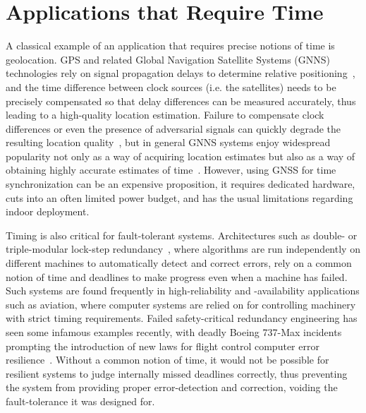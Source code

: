 
\section{Applications that Require Time}
\label{sec:motivation}

A classical example of an application that requires precise notions of time is geolocation. GPS and related Global Navigation Satellite Systems (GNNS) technologies rely on signal propagation delays to determine relative positioning~\cite{intro-to-gnss}, and the time difference between clock sources (i.e. the satellites) needs to be precisely compensated so that delay differences can be measured accurately, thus leading to a high-quality location estimation. Failure to compensate clock differences or even the presence of adversarial signals can quickly degrade the resulting location quality~\cite{gps-jamming}, but in general GNNS systems enjoy widespread popularity not only as a way of acquiring location estimates but also as a way of obtaining highly accurate estimates of time~\cite{gnss-location-and-time-advances,gnss-for-high-precision-timing}. However, using GNSS for time synchronization can be an expensive proposition, it requires dedicated hardware, cuts into an often limited power budget, and has the usual limitations regarding indoor deployment.

Timing is also critical for fault-tolerant systems. Architectures such as double- or triple-modular lock-step redundancy~\cite{triple-modular-redundancy,triple-modular-redundancy-evaluation,triple-modular-lock-step-arm}, where algorithms are run independently on different machines to automatically detect and correct errors, rely on a common notion of time and deadlines to make progress even when a machine has failed. Such systems are found frequently in high-reliability and -availability applications such as aviation, where computer systems are relied on for controlling machinery with strict timing requirements. Failed safety-critical redundancy engineering has seen some infamous examples recently, with deadly Boeing 737-Max incidents prompting the introduction of new laws for flight control computer error resilience~\cite{boeing-requirements}. Without a common notion of time, it would not be possible for resilient systems to judge internally missed deadlines correctly, thus preventing the system from providing proper error-detection and correction, voiding the fault-tolerance it was designed for.


